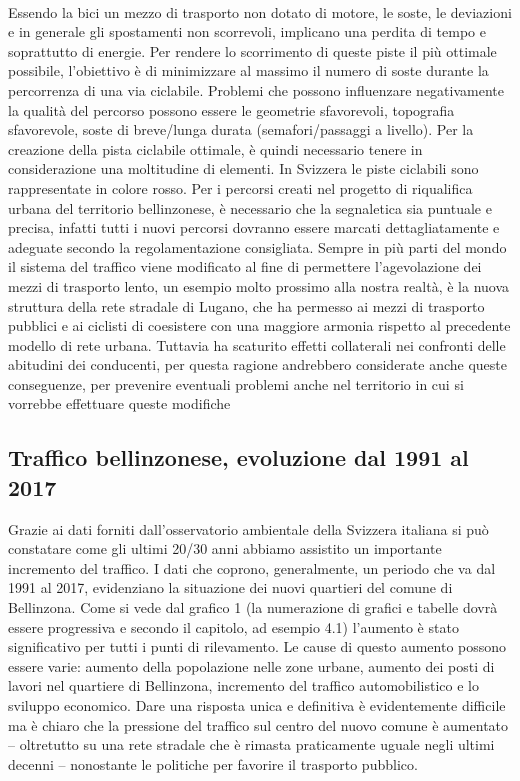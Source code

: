 \\
Essendo la bici un mezzo di trasporto non dotato di motore, le soste, le deviazioni e in generale gli spostamenti non scorrevoli, implicano una perdita di tempo e soprattutto di energie. Per rendere lo scorrimento di queste piste il più ottimale possibile, l’obiettivo è di minimizzare al massimo il numero di soste durante la percorrenza di una via ciclabile. Problemi che possono influenzare negativamente la qualità del percorso possono essere le geometrie sfavorevoli, topografia sfavorevole, soste di breve/lunga durata (semafori/passaggi a livello). 
Per la creazione della pista ciclabile ottimale, è quindi necessario tenere in considerazione una moltitudine di elementi. 
In Svizzera le piste ciclabili sono rappresentate in colore rosso. Per i percorsi creati nel progetto di riqualifica urbana del territorio bellinzonese, è necessario che la segnaletica sia puntuale e precisa, infatti tutti i nuovi percorsi dovranno essere marcati dettagliatamente e adeguate secondo la regolamentazione consigliata. 
Sempre in più parti del mondo il sistema del traffico viene modificato al fine di permettere l’agevolazione dei mezzi di trasporto lento, un esempio molto prossimo alla nostra realtà, è la nuova struttura della rete stradale di Lugano, che ha permesso ai mezzi di trasporto pubblici e ai ciclisti di coesistere con una maggiore armonia rispetto al precedente modello di rete urbana.  Tuttavia ha scaturito effetti collaterali nei confronti delle abitudini dei conducenti, per questa ragione andrebbero considerate anche queste conseguenze, per prevenire eventuali problemi anche nel territorio in cui si vorrebbe effettuare queste modifiche

\subsection{Traffico bellinzonese, evoluzione dal 1991 al 2017}
Grazie ai dati forniti dall’osservatorio ambientale della Svizzera italiana si può constatare come gli ultimi 20/30 anni abbiamo assistito un importante incremento del traffico. I dati che coprono, generalmente, un periodo che va dal 1991 al 2017, evidenziano la situazione dei nuovi quartieri del comune di Bellinzona. Come si vede dal grafico 1 (la numerazione di grafici e tabelle dovrà essere progressiva e secondo il capitolo, ad esempio 4.1) l’aumento è stato significativo per tutti i punti di rilevamento.  Le cause di questo aumento possono essere varie: aumento della popolazione nelle zone urbane, aumento dei posti di lavori nel quartiere di Bellinzona, incremento del traffico automobilistico e lo sviluppo economico. 
Dare una risposta unica e definitiva è evidentemente difficile ma è chiaro che la pressione del traffico sul centro del nuovo comune è aumentato – oltretutto su una rete stradale che è rimasta praticamente uguale negli ultimi decenni – nonostante le politiche per favorire il trasporto pubblico.
